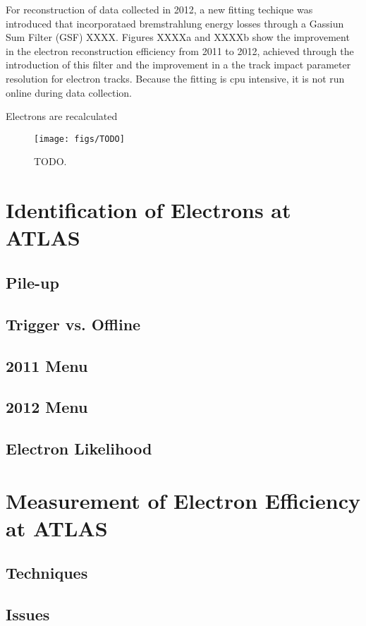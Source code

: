 For reconstruction of data collected in 2012, a new fitting techique was introduced that incorporataed bremstrahlung energy losses through a Gassiun Sum Filter (GSF) XXXX. Figures XXXXa and XXXXb show the improvement in the electron reconstruction efficiency from 2011 to 2012, achieved through the introduction of this filter and the improvement in a the track impact parameter resolution for electron tracks. Because the fitting is cpu intensive, it is not run online during data collection.  

Electrons are recalculated %
\begin{figure}[tp]
    \centering
    \texttt{[image: figs/TODO]}
    \caption{
        TODO.
    }   
    \label{fig:tau/TODO}
\end{figure}



\section{Identification of Electrons at ATLAS}

\subsection{Pile-up}

\subsection{Trigger vs. Offline}

\subsection{2011 Menu}

\subsection{2012 Menu}

\subsection{Electron Likelihood}

\section{Measurement of Electron Efficiency at ATLAS}

\subsection{Techniques}

\subsection{Issues }


